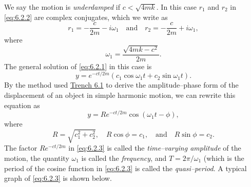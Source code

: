 \documentclass{ximera}
\begin{document}
We say the motion is \textit{underdamped} if $c<\sqrt{4mk}$. In this
case $r_1$ and $r_2$ in \eqref{eq:6.2.2} are complex conjugates, which we
write as
$$
r_1=-\frac{c}{2m}-i\omega_1\quad\mbox{and}\quad
r_2=-\frac{c}{2m}+i\omega_1,
$$
where
$$
\omega_1=\frac{\sqrt{4mk-c^2}}{2m}.
$$
The general solution of  \eqref{eq:6.2.1} in this case is
$$
y=e^{-ct/2m}(c_1\cos\omega_1 t+c_2\sin\omega_1 t).
$$
By the method used \href{https://ximera.osu.edu/ode/main/springProblemsI/springProblemsI}{Trench 6.1}
to derive the
amplitude--phase form of the displacement of an object in simple
harmonic motion, we can rewrite this equation as
\begin{equation}\label{eq:6.2.3}
y=Re^{-ct/2m}\cos(\omega_1 t-\phi),
\end{equation}
 where
$$
R=\sqrt{c_1^2+c_2^2},\quad R\cos\phi=c_1,\quad\mbox{and}\quad R\sin\phi=c_2.
$$
The factor $Re^{-ct/2m}$ in \eqref{eq:6.2.3} is called the \textit{time--varying amplitude} of the motion, the quantity $\omega_1$ is
called the \textit{frequency}, and $T=2\pi/\omega_1$ (which is the
period of the cosine function in \eqref{eq:6.2.3} is called the \textit{quasi--period}. A typical graph of \eqref{eq:6.2.3} is shown below.

\begin{center}
\end{center}

 
\end{document}

